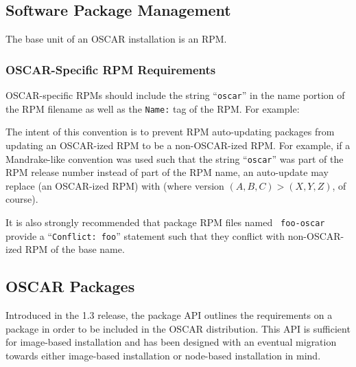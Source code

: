 \subsection{Software Package Management}
\label{sec:design-software-package-mgmt}

The base unit of an OSCAR installation is an RPM.  

\subsubsection{OSCAR-Specific RPM Requirements}
\label{sec:design-software-package-mgmt-rpm-reqs}

OSCAR-specific RPMs should include the string ``{\tt oscar}'' in the
name portion of the RPM filename as well as the {\tt Name:} tag of the
RPM.  For example:

\vspace{10pt}
\centerline{}
\vspace{10pt}

The intent of this convention is to prevent RPM auto-updating packages
from updating an OSCAR-ized RPM to be a non-OSCAR-ized RPM.  For
example, if a Mandrake-like convention was used such that the string
``{\tt oscar}'' was part of the RPM release number instead of part of
the RPM name, an auto-update may replace  (an OSCAR-ized RPM) with
 (where version
$(A, B, C) > (X, Y, Z)$, of course).

It is also strongly recommended that package RPM files named {\tt
  foo-oscar} provide a ``{\tt Conflict: foo}'' statement such that
they conflict with non-OSCAR-ized RPM of the base name.


\subsection{OSCAR Packages}

Introduced in the 1.3 release, the package API outlines the
requirements on a package in order to be included in the OSCAR
distribution.  This API is sufficient for image-based installation and
has been designed with an eventual migration towards either
image-based installation or node-based installation in mind.


